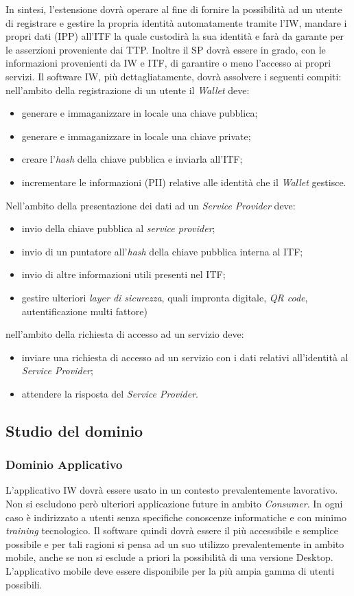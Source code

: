 In sintesi, l’estensione dovrà operare al fine di fornire la possibilità ad un utente di registrare e gestire la propria identità automatamente tramite l’IW, mandare i propri dati (IPP) all’ITF la quale custodirà la sua identità e farà da garante per le asserzioni proveniente dai TTP. Inoltre il SP dovrà essere in grado, con le informazioni provenienti da IW e ITF, di garantire o meno l’accesso ai propri servizi.
Il software IW, più dettagliatamente, dovrà assolvere i seguenti compiti:
nell’ambito della registrazione di un utente il \emph{Wallet} deve:
\begin{itemize}
    \item generare e immaganizzare in locale una chiave pubblica;
    \item generare e immaganizzare in locale una chiave private;
    \item creare l’\emph{hash} della chiave pubblica e inviarla all’ITF;
    \item incrementare le informazioni (PII) relative alle identità che il \emph{Wallet} gestisce.
\end{itemize}
Nell’ambito della presentazione dei dati ad un \emph{Service Provider} deve:
\begin{itemize}
    \item invio della chiave pubblica al \emph{service provider};
    \item invio di un puntatore all’\emph{hash} della chiave pubblica interna al ITF;
    \item invio di altre informazioni utili presenti nel ITF;
    \item gestire ulteriori \emph{layer di sicurezza}, quali impronta digitale, \emph{QR code}, autentificazione multi fattore)
\end{itemize}
nell’ambito della richiesta di accesso ad un servizio deve:
\begin{itemize}
    \item inviare una richiesta di accesso ad un servizio con i dati relativi all’identità al \emph{Service Provider};
    \item attendere la risposta del \emph{Service Provider}.
\end{itemize}

\subsection{Studio del dominio}
\subsubsection{Dominio Applicativo}
L’applicativo IW dovrà essere usato in un contesto prevalentemente lavorativo. Non si escludono però ulteriori applicazione future in ambito \emph{Consumer}. In ogni caso è indirizzato a utenti senza specifiche conoscenze informatiche e con minimo \emph{training} tecnologico. Il software quindi dovrà essere il più accessibile e semplice possibile e per tali ragioni si pensa ad un suo utilizzo prevalentemente in ambito mobile, anche se non si esclude a priori la possibilità di una versione Desktop. L’applicativo mobile deve essere disponibile per la più ampia gamma di utenti possibili.
